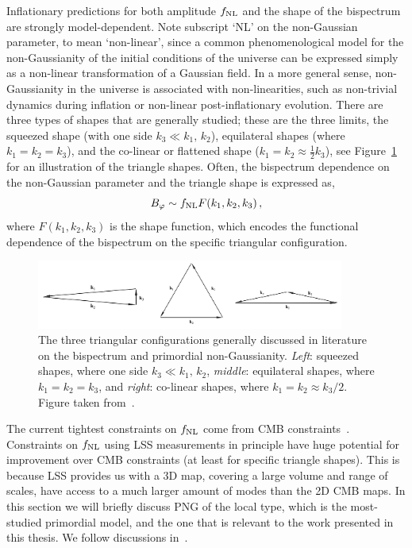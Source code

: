 Inflationary predictions for both amplitude $f_\text{NL}$ and the shape of the bispectrum are strongly model-dependent. Note subscript `NL' on the non-Gaussian parameter, to mean `non-linear', since a common phenomenological model for the non-Gaussianity of the initial conditions of the universe can be expressed simply as a non-linear transformation of a Gaussian field. In a more general sense, non-Gaussianity in the universe is associated with non-linearities, such as non-trivial dynamics during inflation or non-linear post-inflationary evolution. There are three types of shapes that are generally studied; these are the three limits, the squeezed shape (with one side $k_3 \ll k_1,\,k_2$), equilateral shapes (where $k_1 = k_2 = k_3$), and the co-linear or flattened shape ($k_1 = k_2 \approx \frac{1}{2} k_3$), see Figure~\ref{fig:triangleshapes} for an illustration of the triangle shapes. Often, the bispectrum dependence on the non-Gaussian parameter and the triangle shape is expressed as, 
\begin{equation}
	B_\varphi \sim f_\text{NL} F(k_1,k_2,k_3)\,,
\end{equation}
where $F(k_1,k_2,k_3)$ is the shape function, which encodes the functional dependence of the bispectrum on the specific triangular configuration. 

\begin{figure}[!ht]
	\includegraphics[width=0.9\textwidth]{fig/triangleshapes.png}
	\caption{The three triangular configurations generally discussed in literature on the bispectrum and primordial non-Gaussianity. \emph{Left}: squeezed shapes, where one side $k_3 \ll k_1,\,k_2$, \emph{middle}: equilateral shapes, where $k_1 = k_2 = k_3$, and \emph{right}: co-linear shapes, where $k_1 = k_2 \approx k_3/2$. Figure taken from~\cite{Liguori:2010hx}.}\label{fig:triangleshapes}
\end{figure}

The current tightest constraints on $f_\text{NL}$ come from CMB constraints~\cite{Planck:2019kim}. Constraints on $f_\text{NL}$ using LSS measurements in principle have huge potential for improvement over CMB constraints (at least for specific triangle shapes). This is because LSS provides us with a 3D map, covering a large volume and range of scales, have access to a much larger amount of modes than the 2D CMB maps. In this section we will briefly discuss PNG of the local type, which is the most-studied primordial model, and the one that is relevant to the work presented in this thesis. We follow discussions in~\cite{Liguori:2010hx,Fergusson:2008ra}.

